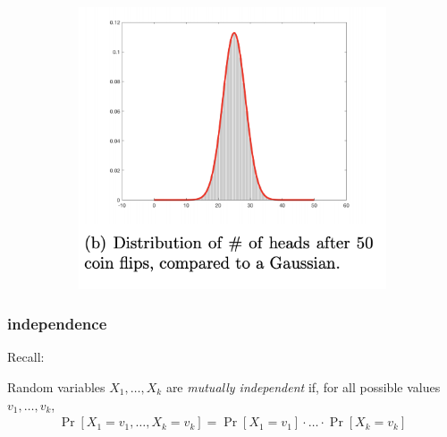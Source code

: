 \documentclass[handout,compress]{beamer}
\begin{document}
\begin{frame}
\begin{figure}
\begin{subfigure}[t]{0.4\textwidth}
		\end{subfigure}
		\hspace{4em}
		\begin{subfigure}[t]{0.4\textwidth}
			\centering
			\includegraphics[width=\textwidth]{cltSkinny.png}
		\end{subfigure}
	\end{figure}
\end{frame}

\begin{frame}
	\frametitle{independence}
	Recall:
	\vspace{1em}
	\begin{definition}
		Random variables $X_1, \ldots, X_k$ are \emph{mutually independent} if, for all possible values $v_1, \ldots, v_k$,
		\begin{align*}
			\Pr[X_1 = v_1, \ldots, X_k = v_k] = 	\Pr[X_1 = v_1]\cdot\ldots \cdot\Pr[X_k = v_k]
		\end{align*}
	\end{definition}
	\begin{center}
	\end{center}
\end{frame}
\end{document}
